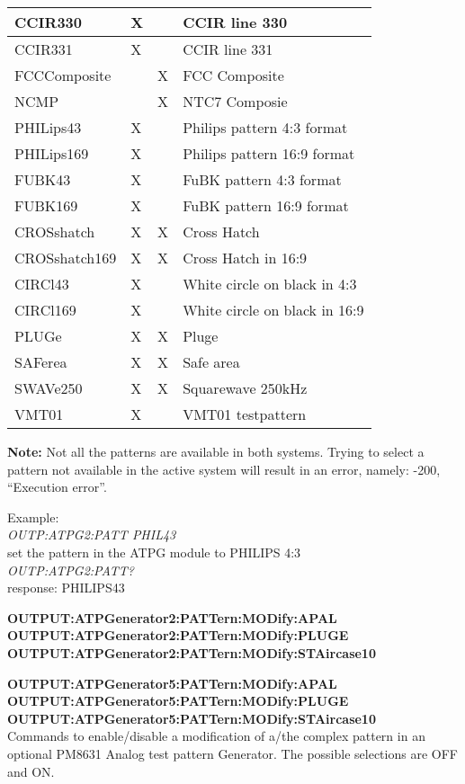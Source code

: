 \begin{tabular}{|l|l|l|l|}
CCIR330		& X			&				& CCIR line 330\\ \hline
CCIR331		& X			&				& CCIR line 331\\ \hline
FCCComposite	&		& X			& FCC Composite\\ \hline
NCMP			&				& X			& NTC7 Composie\\ \hline
PHILips43	& X			&				& Philips pattern 4:3 format\\ \hline
PHILips169	& X		&				& Philips pattern 16:9 format\\ \hline
FUBK43		&	X			&				& FuBK pattern 4:3 format\\ \hline
FUBK169		& X			&				& FuBK pattern 16:9 format\\ \hline
CROSshatch	& X		& X			& Cross Hatch\\ \hline
CROSshatch169	& X	& X			& Cross Hatch in 16:9\\ \hline
CIRCl43		& X			&				& White circle on black in 4:3\\ \hline
CIRCl169	& X			& 			&	White circle on black in 16:9\\ \hline
PLUGe			& X			& X			& Pluge\\ \hline
SAFerea		& X			& X			& Safe area\\ \hline
SWAVe250	& X			& X			& Squarewave 250kHz\\ \hline
VMT01			& X			&				& VMT01 testpattern\\ \hline
\end{tabular}

\textbf{Note:} Not all the patterns are available in both systems. Trying to select a pattern not available in the active system will result in an error, namely: -200, ``Execution error''.

Example:\\
\textit{OUTP:ATPG2:PATT PHIL43}\\
set the pattern in the ATPG module to PHILIPS 4:3\\
\textit{OUTP:ATPG2:PATT?}\\
response: PHILIPS43

\textbf{OUTPUT:ATPGenerator2:PATTern:MODify:APAL}\\
\textbf{OUTPUT:ATPGenerator2:PATTern:MODify:PLUGE}\\
\textbf{OUTPUT:ATPGenerator2:PATTern:MODify:STAircase10}

\textbf{OUTPUT:ATPGenerator5:PATTern:MODify:APAL}\\
\textbf{OUTPUT:ATPGenerator5:PATTern:MODify:PLUGE}\\
\textbf{OUTPUT:ATPGenerator5:PATTern:MODify:STAircase10}\\
Commands to enable/disable a modification of a/the complex pattern in an optional PM8631 Analog test pattern Generator. The possible selections are OFF and ON.

